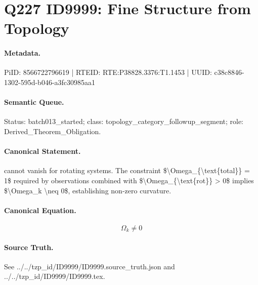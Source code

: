 \section*{Q227 ID9999: Fine Structure from Topology}
\paragraph{Metadata.}
PiID: 8566722796619 | RTEID: RTE:P38828.3376:T1.1453 | UUID: c38c8846-1302-595d-b046-a3fc30985aa1

\paragraph{Semantic Queue.}
Status: batch013\_started; class: topology\_category\_followup\_segment; role: Derived\_Theorem\_Obligation.

\paragraph{Canonical Statement.}
cannot vanish for rotating systems. The constraint \$\textbackslash{}Omega\_\{\textbackslash{}text\{total\}\} = 1\$ required by observations combined with \$\textbackslash{}Omega\_\{\textbackslash{}text\{rot\}\} > 0\$ implies \$\textbackslash{}Omega\_k \textbackslash{}neq 0\$, establishing non-zero curvature.

\paragraph{Canonical Equation.}
\[
\Omega_k \neq 0
\]

\paragraph{Source Truth.}
See ../../tzp\_id/ID9999/ID9999.source\_truth.json and ../../tzp\_id/ID9999/ID9999.tex.
